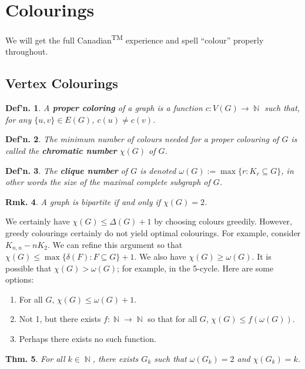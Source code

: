 \documentclass[12pt, a4paper]{book}
\DeclareMathOperator{\N}{\mathbb{N}}
\newtheorem{theorem}{Thm.}[section]
\newtheorem{definition}[theorem]{Def'n.}
\newtheorem{remark}[theorem]{Rmk.}
\theoremstyle{nonumberplain}
\begin{document}
\section{Colourings}
We will get the full Canadian\textsuperscript{TM} experience and spell ``colour'' properly throughout.
\subsection{Vertex Colourings}
\begin{definition}
    A \textbf{proper coloring} of a graph is a function $c:V(G)\to\N$ such that, for any $\{u,v\}\in E(G)$, $c(u)\neq c(v)$.
\end{definition}
\begin{definition}
    The minimum number of colours needed for a proper colouring of $G$ is called the \textbf{chromatic number} $\chi(G)$ of $G$.
\end{definition}
\begin{definition}
    The \textbf{clique number} of $G$ is denoted $\omega(G):=\max\{r:K_r\subseteq G\}$, in other words the size of the maximal complete subgraph of $G$.
\end{definition}
\begin{remark}
    A graph is bipartite if and only if $\chi(G)=2$.
\end{remark}
We certainly have $\chi(G)\leq\Delta(G)+1$ by choosing colours greedily.
However, greedy colourings certainly do not yield optimal colourings.
For example, consider $K_{n,n}-nK_2$.
We can refine this argument so that $\chi(G)\leq\max\{\delta(F):F\subseteq G\}+1$.
We also have $\chi(G)\geq\omega(G)$.
It is possible that $\chi(G)>\omega(G)$; for example, in the 5-cycle.
Here are some options:
\begin{enumerate}
    \item For all $G$, $\chi(G)\leq\omega(G)+1$.
    \item Not 1, but there exists $f:\N\to\N$ so that for all $G$, $\chi(G)\leq f(\omega(G))$.
    \item Perhaps there exists no such function.
\end{enumerate}
\begin{theorem}
    For all $k\in\N$, there exists $G_k$ such that $\omega(G_k)=2$ and $\chi(G_k)=k$.
\end{theorem}
\end{document}
